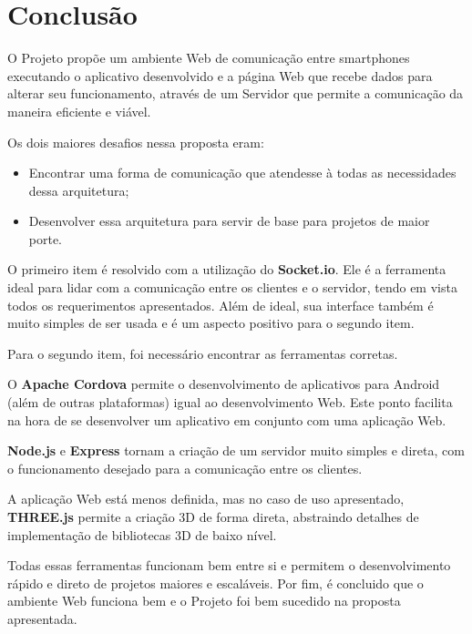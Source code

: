 \documentclass[a4paper,12pt]{article}
\begin{document}
\newpage
\section{Conclusão}

O Projeto propõe um ambiente Web de comunicação entre smartphones executando o aplicativo desenvolvido e a página Web que recebe dados para alterar seu funcionamento, através de um Servidor que permite a comunicação da maneira eficiente e viável.

Os dois maiores desafios nessa proposta eram:

\begin{itemize}
    \item Encontrar uma forma de comunicação que atendesse à todas as necessidades dessa arquitetura;
    \item Desenvolver essa arquitetura para servir de base para projetos de maior porte.
\end{itemize}

O primeiro item é resolvido com a utilização do \textbf{Socket.io}. Ele é a ferramenta ideal para lidar com a comunicação entre os clientes e o servidor, tendo em vista todos os requerimentos apresentados. Além de ideal, sua interface também é muito simples de ser usada e é um aspecto positivo para o segundo item.

Para o segundo item, foi necessário encontrar as ferramentas corretas.

O \textbf{Apache Cordova} permite o desenvolvimento de aplicativos para Android (além de outras plataformas) igual ao desenvolvimento Web. Este ponto facilita na hora de se desenvolver um aplicativo em conjunto com uma aplicação Web.

\textbf{Node.js} e \textbf{Express} tornam a criação de um servidor muito simples e direta, com o funcionamento desejado para a comunicação entre os clientes.

A aplicação Web está menos definida, mas no caso de uso apresentado, \textbf{THREE.js} permite a criação 3D de forma direta, abstraindo detalhes de implementação de bibliotecas 3D de baixo nível.

Todas essas ferramentas funcionam bem entre si e permitem o desenvolvimento rápido e direto de projetos maiores e escaláveis. Por fim, é concluido que o ambiente Web funciona bem e o Projeto foi bem sucedido na proposta apresentada.


\newpage
\end{document}
